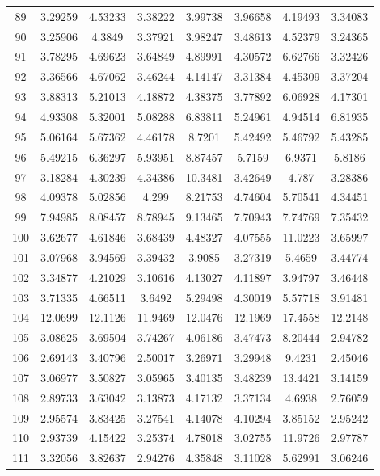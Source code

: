 \begin{center}
\begin{longtable}{cccccccc}
89 & 3.29259 & 4.53233 & 3.38222 & 3.99738 & 3.96658 & 4.19493 & 3.34083\\
90 & 3.25906 & 4.3849 & 3.37921 & 3.98247 & 3.48613 & 4.52379 & 3.24365\\
91 & 3.78295 & 4.69623 & 3.64849 & 4.89991 & 4.30572 & 6.62766 & 3.32426\\
92 & 3.36566 & 4.67062 & 3.46244 & 4.14147 & 3.31384 & 4.45309 & 3.37204\\
93 & 3.88313 & 5.21013 & 4.18872 & 4.38375 & 3.77892 & 6.06928 & 4.17301\\
94 & 4.93308 & 5.32001 & 5.08288 & 6.83811 & 5.24961 & 4.94514 & 6.81935\\
95 & 5.06164 & 5.67362 & 4.46178 & 8.7201 & 5.42492 & 5.46792 & 5.43285\\
96 & 5.49215 & 6.36297 & 5.93951 & 8.87457 & 5.7159 & 6.9371 & 5.8186\\
97 & 3.18284 & 4.30239 & 4.34386 & 10.3481 & 3.42649 & 4.787 & 3.28386\\
98 & 4.09378 & 5.02856 & 4.299 & 8.21753 & 4.74604 & 5.70541 & 4.34451\\
99 & 7.94985 & 8.08457 & 8.78945 & 9.13465 & 7.70943 & 7.74769 & 7.35432\\
100 & 3.62677 & 4.61846 & 3.68439 & 4.48327 & 4.07555 & 11.0223 & 3.65997\\
101 & 3.07968 & 3.94569 & 3.39432 & 3.9085 & 3.27319 & 5.4659 & 3.44774\\
102 & 3.34877 & 4.21029 & 3.10616 & 4.13027 & 4.11897 & 3.94797 & 3.46448\\
103 & 3.71335 & 4.66511 & 3.6492 & 5.29498 & 4.30019 & 5.57718 & 3.91481\\
104 & 12.0699 & 12.1126 & 11.9469 & 12.0476 & 12.1969 & 17.4558 & 12.2148\\
105 & 3.08625 & 3.69504 & 3.74267 & 4.06186 & 3.47473 & 8.20444 & 2.94782\\
106 & 2.69143 & 3.40796 & 2.50017 & 3.26971 & 3.29948 & 9.4231 & 2.45046\\
107 & 3.06977 & 3.50827 & 3.05965 & 3.40135 & 3.48239 & 13.4421 & 3.14159\\
108 & 2.89733 & 3.63042 & 3.13873 & 4.17132 & 3.37134 & 4.6938 & 2.76059\\
109 & 2.95574 & 3.83425 & 3.27541 & 4.14078 & 4.10294 & 3.85152 & 2.95242\\
110 & 2.93739 & 4.15422 & 3.25374 & 4.78018 & 3.02755 & 11.9726 & 2.97787\\
111 & 3.32056 & 3.82637 & 2.94276 & 4.35848 & 3.11028 & 5.62991 & 3.06246\\

\end{longtable}
\end{center}
